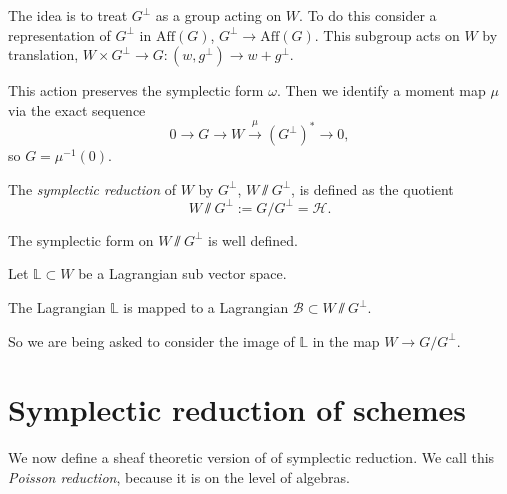     The idea is to treat \(G^\perp\) as a group acting on \(W\). To do this consider a representation of \(G^\perp\) in \(\mathrm{Aff}(G)\), \(G^\perp \rightarrow \mathrm{Aff}(G)\). This subgroup acts on \(W\) by translation, \( W \times G^{\perp} \rightarrow G : (w,g^{\perp} ) \rightarrow w + g^{\perp} \). 
    
    This action preserves the symplectic form \( \omega\). Then we identify a moment map \( \mu\) via the exact sequence
    \[ 0 \rightarrow G \rightarrow W \stackrel{\mu}{\rightarrow} (G^\perp)^* \rightarrow 0,\]
    so \(G = \mu^{-1}(0)\). 
    
    \begin{defn} The \emph{symplectic reduction} of \(W\) by \(G^{\perp}\), \(W \sslash G^{\perp}\), is defined as the quotient 
    \[ W \sslash G^{\perp} := G/G^\perp = \mathcal{H}. \]
    \end{defn}
    
    \begin{lem}
        The symplectic form on \(W \sslash G^{\perp} \) is well defined.
    \end{lem} 
    
    
    Let  \( \mathbb{L} \subset W\) be a Lagrangian sub vector space.
    
    \begin{lem} 
    The Lagrangian \( \mathbb{L}\) is mapped to a Lagrangian \( \mathcal{B}  \subset  W \sslash G^{\perp} \). 
    \end{lem}
    
    So we are being asked to consider the image of \( \mathbb{L}\) in the map \( W \rightarrow G/G^{\perp}\).
    
    
    
    \section{Symplectic reduction of schemes}
    We now define a sheaf theoretic version of of symplectic reduction. We call this \emph{Poisson reduction}, because it is on the level of algebras. 
    
